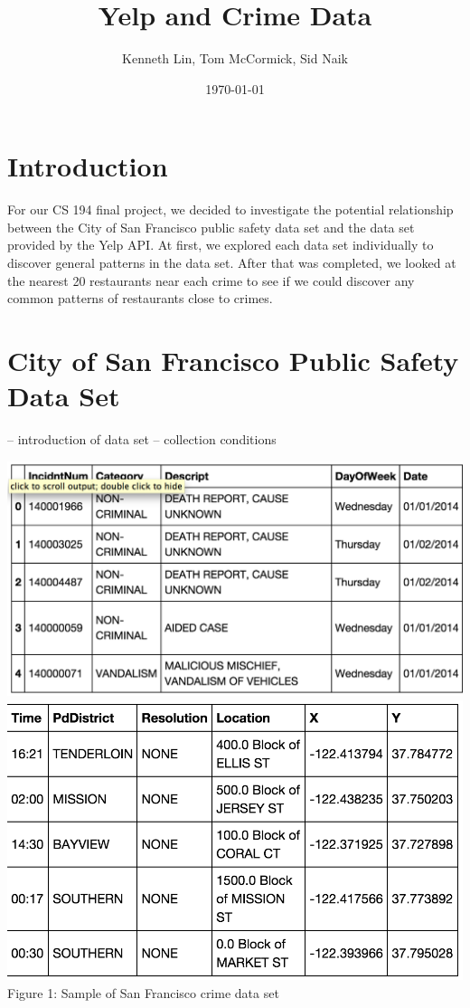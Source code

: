 \documentclass{article}
\title{Yelp and Crime Data}  %
\author{Kenneth Lin, Tom McCormick, Sid Naik}
\date{\today}
\begin{document}
\maketitle

\section{Introduction}

For our CS 194 final project, we decided to investigate the potential
relationship between the City of San Francisco public safety data set and
the data set provided by the Yelp API. At first, we explored each data set
individually to discover general patterns in the data set. After that was
completed, we looked at the nearest 20 restaurants near each crime to see
if we could discover any common patterns of restaurants close to crimes.

\section{City of San Francisco Public Safety Data Set}

-- introduction of data set
-- collection conditions

\begin{center}
  \includegraphics[scale=0.5]{sf_city_sample_1.png} \\
  \includegraphics[scale=0.5]{sf_city_sample_2.png} \\
  Figure 1: Sample of San Francisco crime data set
\end{center}
\end{document}
